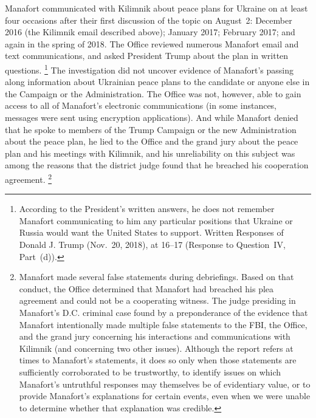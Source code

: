Manafort communicated with Kilimnik about peace plans for Ukraine on at least four occasions after their first discussion of the topic on August~2: December 2016 (the Kilimnik email described above); January 2017; February 2017; and again in the spring of 2018.
The Office reviewed numerous Manafort email and text communications, and asked President Trump about the plan in written questions.%
\footnote{According to the President's written answers, he does not remember Manafort communicating to him any particular positions that Ukraine or Russia would want the United States to support.
Written Responses of Donald J. Trump (Nov.~20, 2018), at 16--17 (Response to Question~IV, Part~(d)).}
The investigation did not uncover evidence of Manafort's passing along information about Ukrainian peace plans to the candidate or anyone else in the Campaign or the Administration.
The Office was not, however, able to gain access to all of Manafort's electronic communications (in some instances, messages were sent using encryption applications).
And while Manafort denied that he spoke to members of the Trump Campaign or the new Administration about the peace plan, he lied to the Office and the grand jury about the peace plan and his meetings with Kilimnik, and his unreliability on this subject was among the reasons that the district judge found that he breached his cooperation agreement.%
\footnote{Manafort made several false statements during debriefings. Based on that conduct, the Office determined that Manafort had breached his plea agreement and could not be a cooperating witness. The judge presiding in Manafort's D.C. criminal case found by a preponderance of the evidence that Manafort intentionally made multiple false statements to the FBI, the Office, and the grand jury concerning his interactions and communications with Kilimnik (and concerning two other issues). Although the report refers at times to Manafort's statements, it does so only when those statements are sufficiently corroborated to be trustworthy, to identify issues on which Manafort's untruthful responses may themselves be of evidentiary value, or to provide Manafort's explanations for certain events, even when we were unable to determine whether that explanation was credible.}


